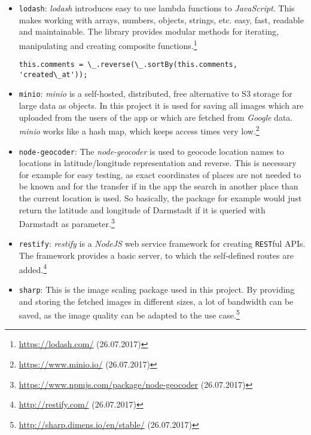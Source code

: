 \begin{itemize}
	\item \texttt{lodash}: \textit{lodash} introduces easy to use lambda functions to \textit{JavaScript}. This makes working with arrays, numbers, objects, strings, etc. easy, fast, readable and maintainable. The library provides modular methods for iterating, manipulating and creating composite functions.\footnote{\url{https://lodash.com/} (26.07.2017)}
	\begin{lstlisting}[caption={Example usage of \textit{lodash} functionality. The shown line of code is extracted from the 'addComment' method. By using this package, in this single line all comments of the current object, where the comments are added, are sorted and the order gets reversed. It is much more readable and compact than coding this by hand.}, label=lst:lodash]
	this.comments = \_.reverse(\_.sortBy(this.comments, 'created\_at'));
	\end{lstlisting}
	\item \texttt{minio}: \textit{minio} is a self-hosted, distributed, free alternative to S3 storage for large data as objects. In this project it is used for saving all images which are uploaded from the users of the app or which are fetched from \textit{Google} data. \textit{minio} works like a hash map, which keeps access times very low.\footnote{\url{https://www.minio.io/} (26.07.2017)}
	\item \texttt{node-geocoder}: The \textit{node-geocoder} is used to geocode location names to locations in latitude/longitude representation and reverse. This is necessary for example for easy testing, as exact coordinates of places are not needed to be known and for the transfer if in the app the search in another place than the current location is used. So basically, the package for example would just return the latitude and longitude of Darmstadt if it is queried with Darmstadt as parameter.\footnote{\url{https://www.npmjs.com/package/node-geocoder} (26.07.2017)}
	\item \texttt{restify}: \textit{restify} is a \textit{NodeJS} web service framework for creating \texttt{REST}ful APIs. The framework provides a basic server, to which the self-defined routes are added.\footnote{\url{http://restify.com/} (26.07.2017)}
	\item \texttt{sharp}: This is the image scaling package used in this project. By providing and storing the fetched images in different sizes, a lot of bandwidth can be saved, as the image quality can be adapted to the use case.\footnote{\url{http://sharp.dimens.io/en/stable/} (26.07.2017)}

\end{itemize}
